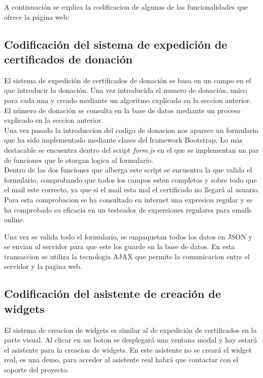 
A continuación se explica la codificacion de algunas de las funcionalidades que ofrece la página web:

\subsection{Codificación del sistema de expedición de certificados de donación}
El sistema de expedición de certificados de donación se basa en un campo en el que introducir la donación. Una vez introducida el numero de donación, unico para cada una y creado mediante un algoritmo explicado en la seccion anterior. El número de donación se consulta en la base de datos mediante un proceso explicado en la seccion anterior.\\

Una vez pasado la introduccion del codigo de donacion nos aparece un formulario que ha sido implementado mediante clases del framework Bootstrap. Lo mas destacable se encuentra dentro del script \textit{form.js} en el que se implementan un par de funciones que le otorgan logica al formulario.\\

Dentro de las dos funciones que alberga este script se encuentra la que valida el formulario, comprobando que todos los campos esten completos y sobre todo que el mail este correcto, ya que si el mail esta mal el certificado no llegará al usuario. Para esta comprobacion se ha consultado en internet una expresion regular y se ha comprobado su eficacia en un testeador de expersiones regulares para emails online. \\


Una vez se valida todo el formulario, se empaquetan todos los datos en JSON y se envian al servidor para que este los guarde en la base de datos. En esta transaccion se utiliza la tecnologia AJAX\cite{ajax} que permite la comunicacion entre el servidor y la pagina web.\\


\subsection{Codificación del asistente de creación de widgets}
El sistema de creacion de widgets es similar al de expedición de certificados en la parte visual. Al clicar en un boton se desplegará una ventana modal y hay estará el asistente para la creacion de widgets. En este asistente no se creará el widget real, es una demo, para acceder al asistente real habrá que contactar con el soporte del proyecto.\\

